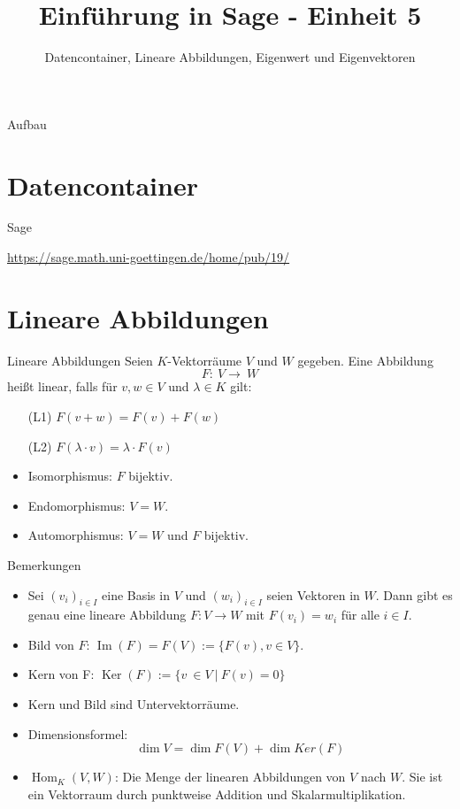\documentclass[hyperref={xetex}]{beamer}
\title{Einführung in Sage - Einheit 5}
\subtitle{Datencontainer, Lineare Abbildungen, Eigenwert und Eigenvektoren}
\begin{document}
\titlepage

\begin{frame}{Aufbau}
\tableofcontents
\end{frame}

\section{Datencontainer}

\begin{frame}{Sage}
    \begin{center}
       \url{https://sage.math.uni-goettingen.de/home/pub/19/}
    \end{center}
\end{frame}



\section{Lineare Abbildungen}

\begin{frame}{Lineare Abbildungen}
Seien $K$-Vektorräume $V$ und $W$ gegeben. Eine Abbildung
\[ F: \ V \rightarrow \ W \]
heißt {\color{red} linear}, falls für $v,w\in V$ und $\lambda \in K$ gilt:
\begin{itemize}
\item [(L1)] $F(v+w)=F(v)+F(w)$
\item [(L2)] $F(\lambda \cdot v)=\lambda \cdot F(v)$
\end{itemize} 
\begin{itemize}
 \item {\color{red} Isomorphismus}: $F$ bijektiv. 
\item {\color{red} Endomorphismus}: $V=W$.
\item {\color{red} Automorphismus}: $V=W$ und $F$ bijektiv.
\end{itemize}

\end{frame}

\begin{frame}{Bemerkungen}
\begin{itemize}
\item Sei $(v_i)_{i\in I}$ eine Basis in $V$ und $(w_i)_{i\in I}$
seien Vektoren in $W$. Dann gibt es genau eine lineare Abbildung $F:V
\rightarrow W$ mit $F(v_i)=w_i$ für alle $i \in I$.
\item {\color{red} Bild} von $F$:   $\mathop{Im}(F) = F(V):=\{ F(v), v \in V \}$.
\item {\color{red} Kern} von F: $\mathop{Ker}(F):=\{v \ \in V \ | \ F(v)=0 \}$
\item Kern und Bild sind Untervektorräume.
\item Dimensionsformel:
\[\dim V = \dim F(V) + \dim Ker(F)\]
\item {\color{red} $\operatorname{Hom}_K(V,W)$}: Die Menge der linearen Abbildungen von $V$ nach $W$. 
Sie ist ein Vektorraum durch punktweise Addition und Skalarmultiplikation.
\end{itemize}
\end{frame}
\end{document}
